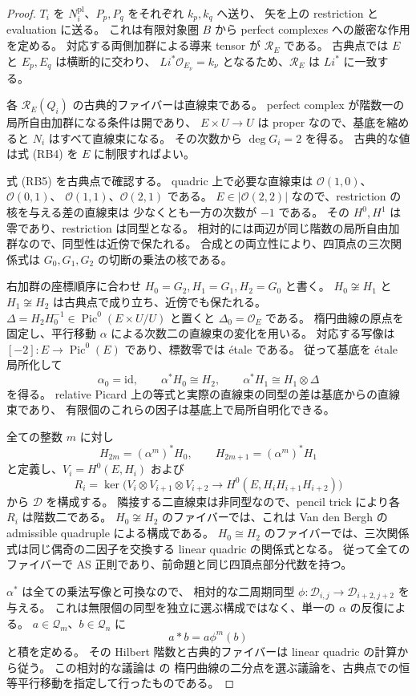 \begin{proof}
$T_i$ を $N_i^{\mathrm{pl}}$、$P_p,P_q$ をそれぞれ $k_p,k_q$ へ送り、
矢を上の restriction と evaluation に送る。
これは有限対象圏 $B$ から perfect complexes への厳密な作用を定める。
対応する両側加群による導来 tensor が $\mathcal R_E$ である。
古典点では $E$ と $E_p,E_q$ は横断的に交わり、
$L i^*\mathcal O_{E_\nu}=k_\nu$ となるため、$\mathcal R_E$ は $L i^*$ に一致する。

各 $\mathcal R_E(Q_i)$ の古典的ファイバーは直線束である。
perfect complex が階数一の局所自由加群になる条件は開であり、
$E\times U\to U$ は proper なので、基底を縮めると $N_i$ はすべて直線束になる。
その次数から $\deg G_i=2$ を得る。
古典的な値は式 (RB4) を $E$ に制限すればよい。

式 (RB5) を古典点で確認する。
quadric 上で必要な直線束は $\mathcal O(1,0)$、$\mathcal O(0,1)$、
$\mathcal O(1,1)$、$\mathcal O(2,1)$ である。
$E\in|\mathcal O(2,2)|$ なので、restriction の核を与える差の直線束は
少なくとも一方の次数が $-1$ である。
その $H^0,H^1$ は零であり、restriction は同型となる。
相対的には両辺が同じ階数の局所自由加群なので、同型性は近傍で保たれる。
合成との両立性により、四頂点の三次関係式は
$G_0,G_1,G_2$ の切断の乗法の核である。

右加群の座標順序に合わせ
$H_0=G_2,H_1=G_1,H_2=G_0$ と書く。
$H_0\not\cong H_1$ と $H_1\not\cong H_2$ は古典点で成り立ち、近傍でも保たれる。
$\Delta=H_2H_0^{-1}\in\operatorname{Pic}^0(E\times U/U)$ と置くと $\Delta_0=\mathcal O_E$ である。
楕円曲線の原点を固定し、平行移動 $\alpha$ による次数二の直線束の変化を用いる。
対応する写像は $[-2]:E\to\operatorname{Pic}^0(E)$ であり、標数零では \'etale である。
従って基底を \'etale 局所化して
\[
 \alpha_0=\mathrm{id},\qquad
 \alpha^*H_0\cong H_2,\qquad
 \alpha^*H_1\cong H_1\otimes\Delta
\]
を得る。
relative Picard 上の等式と実際の直線束の同型の差は基底からの直線束であり、
有限個のこれらの因子は基底上で局所自明化できる。

全ての整数 $m$ に対し
\[
 H_{2m}=(\alpha^m)^*H_0,\qquad
 H_{2m+1}=(\alpha^m)^*H_1
\]
と定義し、$V_i=H^0(E,H_i)$ および
\[
 R_i=\ker\bigl(V_i\otimes V_{i+1}\otimes V_{i+2}
                   \longrightarrow H^0(E,H_iH_{i+1}H_{i+2})\bigr)
\]
から $\mathcal D$ を構成する。
隣接する二直線束は非同型なので、pencil trick により各 $R_i$ は階数二である。
$H_0\not\cong H_2$ のファイバーでは、これは Van den Bergh の admissible quadruple による構成である。
$H_0\cong H_2$ のファイバーでは、三次関係式は同じ偶奇の二因子を交換する
linear quadric の関係式となる。
従って全てのファイバーで AS 正則であり、前命題と同じ四頂点部分代数を持つ。

$\alpha^*$ は全ての乗法写像と可換なので、
相対的な二周期同型 $\phi:\mathcal D_{i,j}\to\mathcal D_{i+2,j+2}$ を与える。
これは無限個の同型を独立に選ぶ構成ではなく、単一の $\alpha$ の反復による。
$a\in\mathcal Q_m$、$b\in\mathcal Q_n$ に
\[
                         a*b=a\phi^m(b)
\]
と積を定める。
その Hilbert 階数と古典的ファイバーは linear quadric の計算から従う。
この相対的な議論は \cite[命題5.6.1、系5.6.2]{VdBQuadrics} の
楕円曲線の二分点を選ぶ議論を、古典点での恒等平行移動を指定して行ったものである。
\end{proof}

